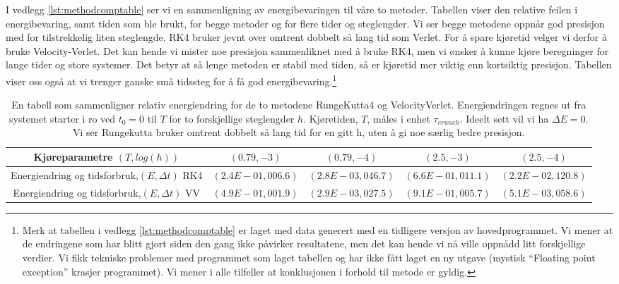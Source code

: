 \documentclass[11pt]{article}
\begin{document}
\begin{multicols}{2}
I vedlegg \ref{lst:methodcomptable} ser vi en sammenligning av energibevaringen til 
våre to metoder. Tabellen viser den relative feilen i energibevaring,
samt tiden som ble brukt, for begge metoder og for flere tider og
steglengder.  Vi ser begge metodene oppnår god presisjon med for tilstrekkelig
liten steglengde. RK4 bruker jevnt over omtrent dobbelt så lang tid
som Verlet. For å spare kjøretid velger vi derfor å bruke 
Velocity-Verlet. Det kan hende vi mister noe presisjon sammenliknet med
å bruke RK4, men vi ønsker å kunne kjøre beregninger for lange tider
og store systemer. Det betyr at så lenge metoden er stabil med tiden,
så er kjøretid mer viktig enn kortsiktig presisjon. Tabellen viser
oss også at vi trenger ganske små tidssteg for å få god
energibevaring.\footnote{Merk at tabellen i vedlegg
  \ref{lst:methodcomptable} er laget med data generert med en
  tidligere versjon av hovedprogrammet. Vi mener at de endringene som
  har blitt gjort siden den gang ikke påvirker resultatene, men det
  kan hende vi nå ville oppnådd litt forskjellige verdier. Vi fikk
  tekniske problemer med programmet som laget tabellen og har ikke
  fått laget en ny utgave (mystisk ``Floating point exception''
  krasjer programmet). Vi mener i alle tilfeller at konklusjonen i
  forhold til metode er gyldig.}

\end{multicols}

\begin{table}[h]
\centering
\caption{En tabell som sammenligner relativ energiendring for de to metodene
RungeKutta4 og VelocityVerlet. Energiendringen regnes ut fra systemet starter
i ro ved $t_0 = 0$ til $T$ for to forskjellige steglengder
$h$.  Kjøretiden, $T$, måles i enhet $\tau_{crunch}$. Ideelt sett vil vi ha $\Delta E = 0$. Vi ser Rungekutta bruker omtrent dobbelt så lang tid for en gitt h,
uten å gi noe særlig bedre presisjon.}
\label{tab:RKvsVV}
\vspace{0.5cm}
\begin{tabular}{ccccc}
Kjøreparametre $(T, log(h))$ & $(0.79,-3)$ & $(0.79,-4)$ & $(2.5,-3)$ & $(2.5,-4)$ \\
\hline 
Energiendring og tidsforbruk,$(E,\Delta t)$ RK4 & $(2.4E-01, 006.6)$ & $(2.8E-03, 046.7)$ & $(6.6E-01, 011.1)$ & $(2.2E-02, 120.8)$ \\
Energiendring og tidsforbruk,$(E,\Delta t)$ VV & $(4.9E-01, 001.9)$ & $(2.9E-03, 027.5)$ & $(9.1E-01, 005.7)$ & $(5.1E-03, 058.6)$ \\
\hline
\end{tabular}
\end{table}
\end{document}
